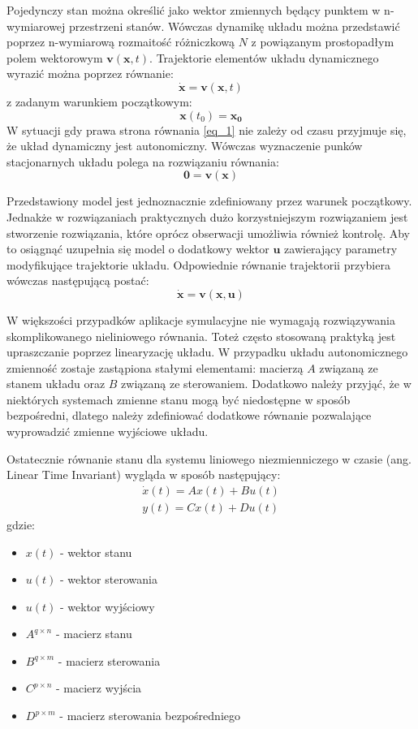 \documentclass[12pt, oneside]{report}
\theoremstyle{definition}
\begin{document}
Pojedynczy stan można określić jako wektor zmiennych będący punktem w n-wymiarowej przestrzeni stanów. Wówczas dynamikę układu można przedstawić poprzez n-wymiarową rozmaitość różniczkową \(N\) z powiązanym prostopadłym polem wektorowym \(\mathbf{v}(\mathbf{x},t)\). Trajektorie elementów układu dynamicznego wyrazić można poprzez równanie:
\begin{equation} \label{eq_1}
\dot{\mathbf{x}} = \mathbf{v}(\mathbf{x},t)
\end{equation}
z zadanym warunkiem początkowym:
\begin{equation}
\mathbf{x}(t_0) = \mathbf{x_0}
\end{equation}
W sytuacji gdy prawa strona równania \ref{eq_1} nie zależy od czasu przyjmuje się, że układ dynamiczny jest autonomiczny. Wówczas wyznaczenie punków stacjonarnych układu polega na rozwiązaniu równania:
\begin{equation}
\mathbf{0} = \mathbf{v}(\mathbf{x})
\end{equation}

Przedstawiony model jest jednoznacznie zdefiniowany przez warunek początkowy. Jednakże w rozwiązaniach praktycznych dużo korzystniejszym rozwiązaniem jest stworzenie rozwiązania, które oprócz obserwacji umożliwia również kontrolę. Aby to osiągnąć uzupełnia się model o dodatkowy wektor \(\mathbf{u}\) zawierający parametry modyfikujące trajektorie układu. Odpowiednie równanie trajektorii przybiera wówczas następującą postać:
\begin{equation}
\dot{\mathbf{x}} = \mathbf{v}(\mathbf{x},\mathbf{u})
\end{equation}

W większości przypadków aplikacje symulacyjne nie wymagają rozwiązywania skomplikowanego nieliniowego równania. Toteż często stosowaną praktyką jest upraszczanie poprzez linearyzację układu. W przypadku układu autonomicznego zmienność zostaje zastąpiona stałymi elementami: macierzą \(A\) związaną ze stanem układu oraz \(B\) związaną ze sterowaniem. Dodatkowo należy przyjąć, że w niektórych systemach zmienne stanu mogą być niedostępne w sposób bezpośredni, dlatego należy zdefiniować dodatkowe równanie pozwalające wyprowadzić zmienne wyjściowe układu.

Ostatecznie równanie stanu dla systemu liniowego niezmienniczego w czasie (ang. Linear Time Invariant) wygląda w sposób następujący:
\begin{gather}
\dot{x}(t) = Ax(t) + Bu(t) \\
y(t) = Cx(t) + Du(t)
\end{gather}
gdzie:
\begin{itemize}
\item \(x(t)\) - wektor stanu
\item \(u(t)\) - wektor sterowania
\item \(u(t)\) - wektor wyjściowy
\item \(A^{q \times n}\) - macierz stanu
\item \(B^{q \times m}\) - macierz sterowania
\item \(C^{p \times n}\) - macierz wyjścia
\item \(D^{p \times m}\) - macierz sterowania bezpośredniego
\end{itemize}
\end{document}
